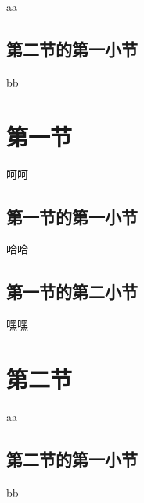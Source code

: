 aa

\subsection{第二节的第一小节}

bb

\section{第一节}

呵呵

\subsection{第一节的第一小节}

哈哈

\subsection{第一节的第二小节}

嘿嘿

\section{第二节}

aa

\subsection{第二节的第一小节}

bb

